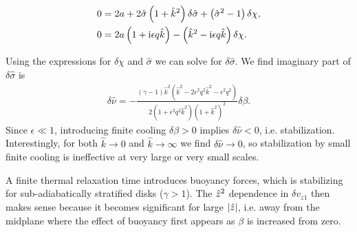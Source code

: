 \begin{align}
  0 &= 2a + 2\hat{\sigma}\left(1+\hat{k}^2\right)\delta\hat{\sigma} +
  \left(\hat{\sigma}^2 -1\right)\delta\chi, \\
  0&= 2a\left(1+\mathrm{i}\epsilon q \hat{k}\right) - \left(\hat{k}^2 - \mathrm{i}\epsilon
    q \hat{k}\right)\delta\chi.
\end{align} 

Using the expressions for $\delta\chi$ and $\hat{\sigma}$ we can solve
for $\delta\hat{\sigma}$. We find imaginary part of $\delta\hat{\sigma}$
is 
\begin{align}
  \delta\hat{\nu} =
  -\frac{\left(\gamma-1\right)\hat{k}^2 \left(\hat{k}^2 -
      2\epsilon^2q^2\hat{k}^2 - \epsilon^2q^2\right)}{2\left(1+\epsilon^2 q^2
      \hat{k}^2\right)\left(1+\hat{k}^2\right)^2}\delta\beta.  
\end{align}
Since $\epsilon \ll 1$, introducing finite cooling $\delta\beta>0$
implies $\delta\hat{\nu} < 0$, i.e. stabilization. Interestingly, for both
$\hat{k}\to0$ and $\hat{k}\to\infty$ we find $\delta\hat{\nu}\to0$, so
stabilization by small finite cooling is ineffective at very large or
very small scales. 

A finite thermal relaxation time introduces buoyancy
forces, which is stabilizing for sub-adiabatically stratified disks
($\gamma > 1$). The $\hat{z}^2$ dependence in $\delta v_{z1}$ then makes
sense because it becomes significant for large $|\hat{z}|$, i.e. away from
the midplane where the effect of buoyancy first appears as $\beta$ is
increased from zero. 

